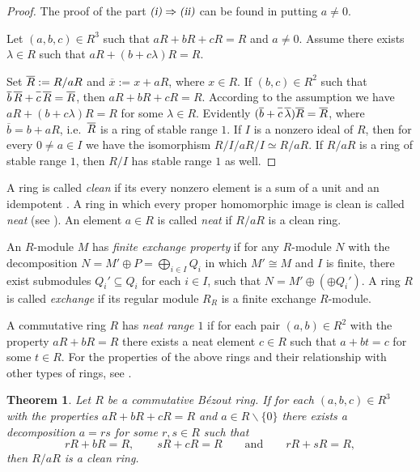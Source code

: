 \documentclass[12pt,a4paper, reqno]{amsart}
\newtheorem{theorem}{Theorem}
\begin{document}
\begin{proof}
The proof of the  part $\textsl{(i)} \Rightarrow \textsl{(ii)}$  can be found in \cite[Theorem~3.6]{4-mcGovern} putting  $a\ne 0$.

Let $(a,b,c)\in R^3$ such that  $aR+bR+cR=R$ and $a\ne0$. Assume  there exists  $\lambda\in R$ such that $aR+(b+c\lambda)R=R$.


Set  $\overline{R\vphantom{b}}:=R/aR$ and $\overline{x}:=x+aR$, where $x\in R$. If $(b,c)\in R^2$ such that
$\overline{b}\,\overline{R\vphantom{b}}+\overline{c\vphantom{b}}\,\overline{R\vphantom{b}}=\overline{R\vphantom{b}}$,
then $aR+bR+cR=R$. According to the assumption
we have $aR+(b+c\lambda)R=R$ for some $\lambda\in R$.
Evidently $(\overline{b}+\overline{c\vphantom{b}}\,\overline{\lambda})\overline{R\vphantom{b}}=\overline{R\vphantom{b}}$,
where $\overline{b}=b+aR$, i.e.~$\overline{R\vphantom{b}}$ is a ring of stable range $1$. If $I$ is a nonzero ideal of $R$, then for every  $0\not=a\in I$ we have the isomorphism $R/I\big /aR/I\simeq  R/aR$. If $R/aR$ is a ring of stable range $1$, then  $R/I$ has  stable range $1$ as well.
\end{proof}

A ring  is called {\it clean} if its every    nonzero element   is  a sum of a unit and an idempotent \cite{Nicholson_77}.
A ring  in  which every  proper homomorphic image is clean   is called {\it neat} (see \cite[p.\,248]{6-mcGovern}).
An element $a\in R$ is called  {\it neat} if $R/aR$ is a clean ring.



An $R$-module $M$  has {\it finite exchange property} if for any $R$-module $N$ with the  decomposition
$N=M'\oplus P=\bigoplus_{i\in I}Q_i$ in which  $M'\cong M$ and $I$ is finite, there exist submodules $Q_i'\subseteq Q_i$ for each $i\in I$, such that $N=M'\oplus(\oplus Q_i')$. A ring $R$ is called {\it exchange} if its regular module $R_R$  is a  finite exchange $R$-module.






A commutative ring $R$ has {\it  neat range $1$} if for each pair  $(a,b)\in R^2$ with the property   \linebreak
$aR+bR=R$ there exists a neat element $c\in R$ such that $a+bt=c$ for some $t\in R$. For the properties of the above rings and their relationship with other types of rings, see \cite{Vas, Lam_2, Lam_3, 6-mcGovern, 10-zabgat, 9-zabavsky}.

\begin{theorem}\label{T:5}
Let $R$ be a commutative B\'ezout ring. If for each  $(a,b,c)\in R^3$  with the properties   $aR+bR+cR=R$ and $a\in R\backslash\{0\}$ there exists a decomposition $a=rs$  for some $r,s\in R$  such that
\begin{equation}\label{Edvvr:1}
rR+bR=R,\qquad  sR+cR=R\qquad  \text{and}\qquad  rR+sR=R,
\end{equation}
then $R/aR$ is a clean ring.
\end{theorem}
\end{document}
